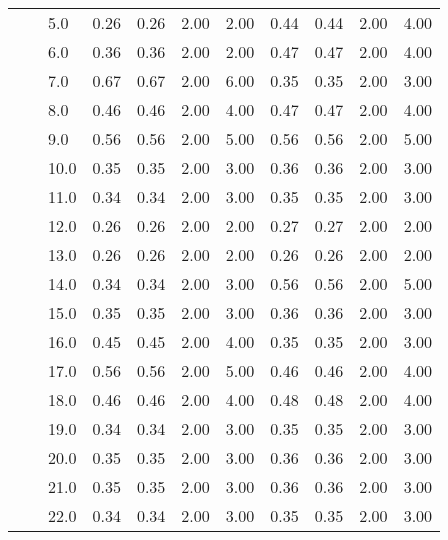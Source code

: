 \begin{tabular}{lllrrrrrrrr}
       &     & 5.0  &       0.26 &      0.26 & 2.00 &   2.00 &       0.44 &      0.44 & 2.00 &   4.00 \\
       &     & 6.0  &       0.36 &      0.36 & 2.00 &   2.00 &       0.47 &      0.47 & 2.00 &   4.00 \\
       &     & 7.0  &       0.67 &      0.67 & 2.00 &   6.00 &       0.35 &      0.35 & 2.00 &   3.00 \\
       &     & 8.0  &       0.46 &      0.46 & 2.00 &   4.00 &       0.47 &      0.47 & 2.00 &   4.00 \\
       &     & 9.0  &       0.56 &      0.56 & 2.00 &   5.00 &       0.56 &      0.56 & 2.00 &   5.00 \\
       &     & 10.0 &       0.35 &      0.35 & 2.00 &   3.00 &       0.36 &      0.36 & 2.00 &   3.00 \\
       &     & 11.0 &       0.34 &      0.34 & 2.00 &   3.00 &       0.35 &      0.35 & 2.00 &   3.00 \\
       &     & 12.0 &       0.26 &      0.26 & 2.00 &   2.00 &       0.27 &      0.27 & 2.00 &   2.00 \\
       &     & 13.0 &       0.26 &      0.26 & 2.00 &   2.00 &       0.26 &      0.26 & 2.00 &   2.00 \\
       &     & 14.0 &       0.34 &      0.34 & 2.00 &   3.00 &       0.56 &      0.56 & 2.00 &   5.00 \\
       &     & 15.0 &       0.35 &      0.35 & 2.00 &   3.00 &       0.36 &      0.36 & 2.00 &   3.00 \\
       &     & 16.0 &       0.45 &      0.45 & 2.00 &   4.00 &       0.35 &      0.35 & 2.00 &   3.00 \\
       &     & 17.0 &       0.56 &      0.56 & 2.00 &   5.00 &       0.46 &      0.46 & 2.00 &   4.00 \\
       &     & 18.0 &       0.46 &      0.46 & 2.00 &   4.00 &       0.48 &      0.48 & 2.00 &   4.00 \\
       &     & 19.0 &       0.34 &      0.34 & 2.00 &   3.00 &       0.35 &      0.35 & 2.00 &   3.00 \\
       &     & 20.0 &       0.35 &      0.35 & 2.00 &   3.00 &       0.36 &      0.36 & 2.00 &   3.00 \\
       &     & 21.0 &       0.35 &      0.35 & 2.00 &   3.00 &       0.36 &      0.36 & 2.00 &   3.00 \\
       &     & 22.0 &       0.34 &      0.34 & 2.00 &   3.00 &       0.35 &      0.35 & 2.00 &   3.00 \\

\end{tabular}

